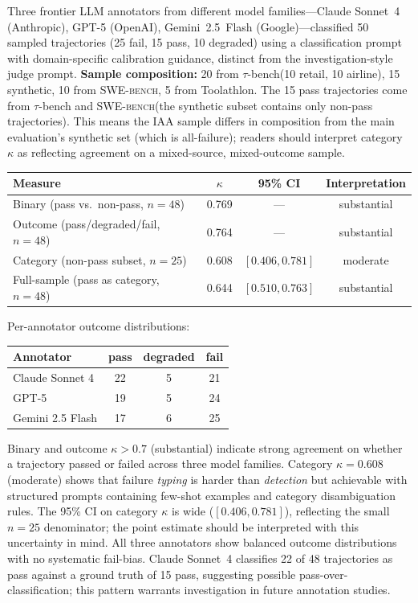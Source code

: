 \documentclass[11pt]{article}
\newcommand{\taubench}{$\tau$-bench\xspace}
\newcommand{\swebench}{\textsc{SWE-bench}\xspace}
\begin{document}
Three frontier LLM annotators from different model families---Claude
Sonnet~4 (Anthropic), GPT-5 (OpenAI), Gemini~2.5~Flash
(Google)---classified 50 sampled trajectories (25 fail, 15 pass, 10
degraded) using a classification prompt with domain-specific calibration
guidance, distinct from the investigation-style judge prompt.
\textbf{Sample composition:} 20 from \taubench (10 retail, 10 airline),
15 synthetic, 10 from \swebench, 5 from Toolathlon. The 15 pass
trajectories come from \taubench and \swebench (the synthetic subset
contains only non-pass trajectories). This means the IAA sample differs
in composition from the main evaluation's synthetic set (which is
all-failure); readers should interpret category $\kappa$ as reflecting
agreement on a mixed-source, mixed-outcome sample.

\begin{center}
\small
\begin{tabular}{@{}lccc@{}}
\toprule
\textbf{Measure} & \textbf{$\kappa$} & \textbf{95\% CI} & \textbf{Interpretation} \\
\midrule
Binary (pass vs.\ non-pass, $n=48$) & 0.769 & --- & substantial \\
Outcome (pass/degraded/fail, $n=48$) & 0.764 & --- & substantial \\
Category (non-pass subset, $n=25$) & 0.608 & $[0.406, 0.781]$ & moderate \\
Full-sample (pass as category, $n=48$) & 0.644 & $[0.510, 0.763]$ & substantial \\
\bottomrule
\end{tabular}
\end{center}

\noindent Per-annotator outcome distributions:

\begin{center}
\small
\begin{tabular}{@{}lccc@{}}
\toprule
\textbf{Annotator} & \textbf{pass} & \textbf{degraded} & \textbf{fail} \\
\midrule
Claude Sonnet 4 & 22 & 5 & 21 \\
GPT-5 & 19 & 5 & 24 \\
Gemini 2.5 Flash & 17 & 6 & 25 \\
\bottomrule
\end{tabular}
\end{center}

Binary and outcome $\kappa > 0.7$ (substantial) indicate strong
agreement on whether a trajectory passed or failed across three model
families. Category $\kappa = 0.608$ (moderate) shows that failure
\emph{typing} is harder than \emph{detection} but achievable with
structured prompts containing few-shot examples and category
disambiguation rules. The 95\% CI on category $\kappa$ is wide
($[0.406, 0.781]$), reflecting the small $n = 25$ denominator; the
point estimate should be interpreted with this uncertainty in mind.
All three annotators show balanced outcome distributions with no
systematic fail-bias. Claude Sonnet~4 classifies 22 of 48 trajectories
as pass against a ground truth of 15 pass, suggesting possible
pass-over-classification; this pattern warrants investigation in
future annotation studies.
\end{document}

